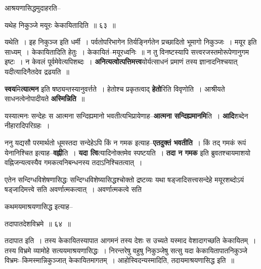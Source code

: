 \documentclass[article,12pt,a4paper]{memoir}
\begin{document}
	आश्रयणासिद्धमुदाहरति--  
	  
	यथेह निकुञ्जे मयूरः केकायितादिति ॥ ६३ ॥ 
	  
	यथेति । इह निकुञ्ज इति धर्मी । पर्वतोपरिभागेन तिर्यङ्निर्गतेन प्रच्छादितो भूमागो निकुञ्जः । मयूर इति साध्यम् । केकायितादिति हेतुः । केकायितं--मयूरध्वनिः ॥ न तु विनष्टस्यापि सत्त्वरजस्तमोरूपेणानुगम इष्टः । न केवलं पूर्वमेवेत्यपिशब्दः । \textbf{अनित्यत्वोत्पत्तिमत्त्व}योर्यत्साधनं प्रमाणं तस्य  ज्ञानादनिश्चयात् यदीत्यादिनैतदेव द्रढयति ॥
	\pend
      

	  \pstart \textbf{स्वय}मि\textbf{त्यात्मन} इति षष्ठ्यन्तस्यानुवर्त्तते । हेतोश्च प्रकृतत्वाद् \textbf{हेतो}रिति विवृणोति । आश्रीयते साधनत्वेनोपादीयते \textbf{अस्मिन्निति} ॥
	\pend
      

	  \pstart यस्यात्मनः सन्देहः स आत्मना सन्दिह्यमानो भवतीत्यभिप्रायेणाह--\textbf{आत्मना सन्दिह्यमानमि}ति । \textbf{आदि}शब्देन नीहारादिपरिग्रहः ।
	\pend
      

	  \pstart ननु यद्यसौ परमार्थतो धूमस्तदा सन्देहेऽपि किं न गमक इत्याह--\textbf{एतदुक्तं भवतीति} । किं तद् गमकं रूपं येनानिश्चित इत्याह--\textbf{वह्नी}ति । \textbf{यदा त्वि}त्यादिनोक्तमेव स्पष्टयति । \textbf{तदा न गमक} इति ब्रुवतश्चायमाशयो वह्निजन्यत्वस्यैव गमकत्वनिबन्धनस्य तदाऽनिश्चितत्वात् ।
	\pend
      

	  \pstart एतेन सन्दिग्धविशेषणासिद्धः सन्दिग्धविशेष्यासिद्धश्चोक्तो द्रष्टव्यः \leavevmode{} यथा षड्जादिसत्त्वसन्देहे मयूरशब्दोऽयं षड्जादिमत्त्वे सति अवर्णात्मकत्वात् । अवर्णात्मकत्वे सति  \leavevmode{} 
	  
	कथमयमाश्रयणासिद्ध इत्याह--  
	  
	तदापातदेशविभ्रमे ॥ ६४ ॥ 
	  
	तदापात इति । तस्य केकायितस्यापात आगमनं तस्य देशः स उच्यते यस्माद वेशादागच्छति केकायितम् । तस्य विभ्रमे व्यामोहे सत्ययमाश्रयणासिद्धः । निरन्तरेषु वहुषु निकुञ्जेषु सत्सु यदा केकायितापातनिकुञ्जे विभ्रमः--किमस्मान्निकुञ्जात् केकायितमागतम् । आहोस्विदन्यस्मादिति, तदायमाश्रयणासिद्ध इति ॥  
	  
\end{document}
